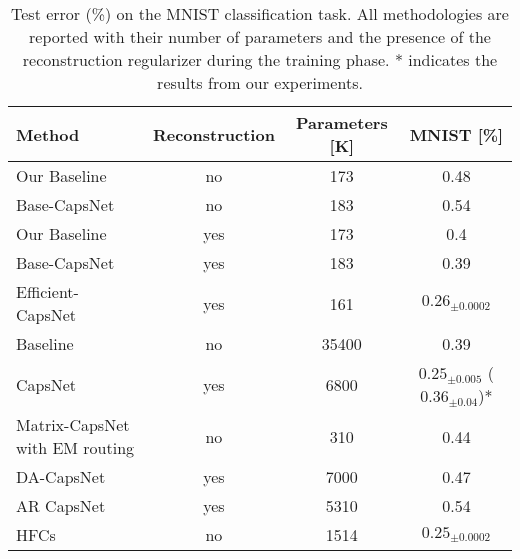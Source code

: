\documentclass{article}
\begin{document}
\begin{table}[h!]
\centering
\begin{tabular}{lccc}
\toprule
Method            & Reconstruction & Parameters {[}K{]} & MNIST {[}\%{]}                  \\ \hline
Our Baseline      & no              & 173                & 0.48                        \\ 
Base-CapsNet      & no              & 183                & 0.54                        \\ 
Our Baseline      & yes              & 173                & 0.4                         \\ 
Base-CapsNet       & yes              & 183                & 0.39                        \\ 
Efficient-CapsNet & yes              & 161                & $0.26_{\pm 0.0002}$              \\ \hline
Baseline \cite{sabour2017dynamic}          & no              & 35400              & 0.39                        \\ 
CapsNet \cite{sabour2017dynamic}           & yes              & 6800               & $0.25_{\pm 0.005}$ ($0.36_{\pm 0.04}$)* \\
Matrix-CapsNet with EM routing \cite{hinton2018matrix}  & no              & 310               & 0.44                        \\ 
DA-CapsNet \cite{huang2020capsnet}        & yes              & 7000               & 0.47                        \\ 
AR CapsNet \cite{choi2019attention} & yes & 5310 & 0.54 \\
HFCs \cite{byerly2020branching}              & no              & 1514               & $0.25_{\pm 0.0002}$              \\ \bottomrule
\end{tabular}
\caption{Test error (\%) on the MNIST classification task. All methodologies are reported with their number of parameters and the presence of the reconstruction regularizer during the training phase. * indicates the results from our experiments.}
\label{tab:mnist_results}
\end{table}
\end{document}
